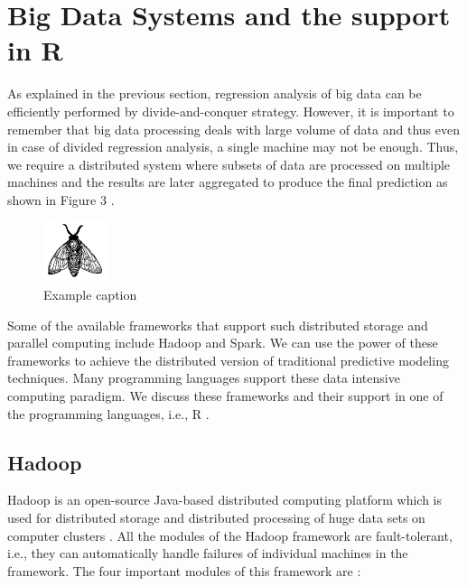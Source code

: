 \documentclass[sigconf]{acmart}
\begin{document}
\section{Big Data Systems and the support in R}
As explained in the previous section, regression analysis of big data can be efficiently performed by divide-and-conquer strategy. However, it is important to remember that big data processing deals with large volume of data and thus even in case of divided regression analysis, a single machine may not be enough. Thus, we require a distributed system where subsets of data are processed on multiple machines and the results are later aggregated to produce the final prediction as shown in Figure 3 \cite{dkr-reg}.
\begin{figure}[!ht]
  \centering\includegraphics[width=\columnwidth]{images/fly.pdf}
  \caption{Example caption}\label{f:fly}
\end{figure}
Some of the available frameworks that support such distributed storage and parallel computing include Hadoop and Spark. We can use the power of these frameworks to achieve the distributed version of traditional predictive modeling techniques. Many programming languages support these data intensive computing paradigm. We discuss these frameworks and their support in one of the programming languages, i.e., R \cite{log-reg}. 

\subsection{Hadoop} 
Hadoop is an open-source Java-based distributed computing platform which is used for distributed storage and distributed processing of huge data sets on computer clusters \cite{log-reg}. All the modules of the Hadoop framework are fault-tolerant, i.e., they can automatically handle failures of individual machines in the framework. The four important modules of this framework are \cite{log-reg}:
\end{document}
